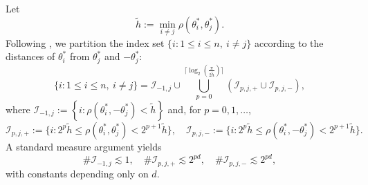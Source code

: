 \documentclass{article}
\numberwithin{equation}{section}
\begin{document}
Let
\begin{equation*}
        \tilde{h}:=\min\limits_{i\neq j}\rho(\theta_i^*,\theta_j^*).
\end{equation*}
Following \cite{liu2025integral}, we partition the index set $\{i:1\leq i\leq n,~i\neq j\}$ according to the distances of $\theta_i^*$ from $\theta_j^*$ and $-\theta_j^*$:
\begin{equation*}
    \{i:1\leq i\leq n,~i\neq j\}=\mathcal{I}_{-1,j}\cup\bigcup\limits_{p=0}^{\lceil\log_2\left(\frac{\pi}{2\tilde h}\right)\rceil}\left(\mathcal{I}_{p,j,+}\cup\mathcal{I}_{p,j,-}\right),
\end{equation*}
where $\mathcal{I}_{-1,j}:=\left\{i:\rho(\theta_i^*,-\theta_j^*)<\tilde h\right\}$ and, for $p=0,1,\dots$,
$$\mathcal{I}_{p,j,+}:=\{i:2^p\tilde h\leq\rho(\theta_i^*,\theta_j^*)<2^{p+1}\tilde h\},\quad\mathcal{I}_{p,j,-}:=\{i:2^p\tilde h\leq\rho(\theta_i^*,-\theta_j^*)<2^{p+1}\tilde h\}.$$
A standard measure argument yields
$$\#\mathcal{I}_{-1,j}\lesssim1,\quad\#\mathcal{I}_{p,j,+}\lesssim2^{pd},\quad\#\mathcal{I}_{p,j,-}\lesssim2^{pd},$$
with constants depending only on $d$.
\end{document}
